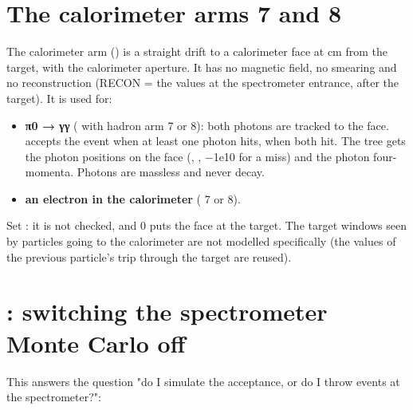 \section{\texorpdfstring{The calorimeter arms 7 and 8}{The calorimeter arms 7 and 8}}\label{user_manual-06u5fspectrometers:63-the-calorimeter-arms-7-and-8}
The calorimeter arm () is a straight drift to a calorimeter face at \hyperref[param:driftu5ftou5fcal]{} cm from the target, with the
calorimeter aperture. It has no magnetic field, no smearing and no reconstruction (RECON = the values at the spectrometer
entrance, after the target). It is used for:

\begin{itemize}
\item \textbf{π0 → γγ} (\hyperref[param:doingu5fpizero]{} with hadron arm 7 or 8): both photons are tracked to the face.  accepts the
event when at least one photon hits,  when both hit. The tree gets the photon positions on the face (,
, −1e10 for a miss) and the photon four-momenta. Photons are massless and never decay.
\item \textbf{an electron in the calorimeter} (\hyperref[param:electronu5farm]{} 7 or 8).
\end{itemize}
Set \hyperref[param:driftu5ftou5fcal]{}: it is not checked, and 0 puts the face at the target. The target windows seen by particles going to
the calorimeter are not modelled specifically (the values of the previous particle's trip through the target are reused).

\section{\texorpdfstring{: switching the spectrometer Monte Carlo off}{spect\_\allowbreak{}mode: switching the spectrometer Monte Carlo off}}\label{user_manual-06u5fspectrometers:64-spectu5fmode-switching-the-spectrometer-monte-carlo-off}
This answers the question "do I simulate the acceptance, or do I throw events at the spectrometer?":

